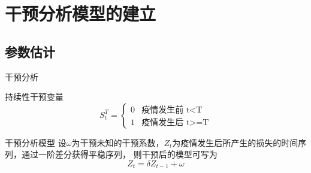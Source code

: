\documentclass[10pt]{beamer}
\begin{document}
\section{干预分析模型的建立}

\subsection{参数估计}
\begin{frame}{干预分析}
  \begin{block}{持续性干预变量}
    \[S_t^T = \begin{cases}
      0& \text{疫情发生前 t<T}\\
      1& \text{疫情发生后 t>=T}
    \end{cases}\]
  \end{block}
  \begin{block}{干预分析模型}
    设\(\omega\)为干预未知的干预系数，\(Z_t\)为疫情发生后所产生的损失的时间序列，通过一阶差分获得平稳序列，
    则干预后的模型可写为
    \[Z_t = \delta Z_{t-1} + \omega\]
  \end{block}
\end{frame}
\end{document}
